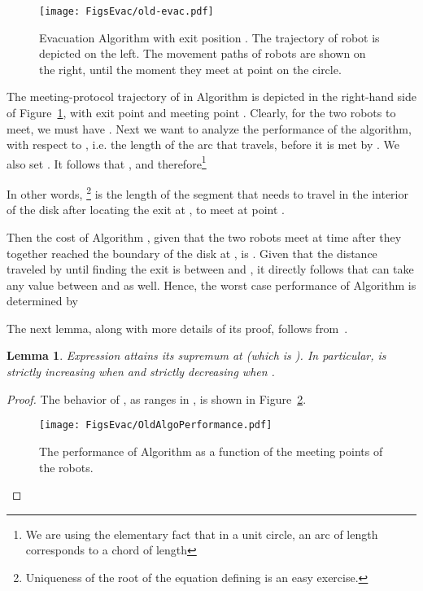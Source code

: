 \documentclass[
final
]{dmtcs-episciences}
\newtheorem{lemma}[theorem]{Lemma}
\theoremstyle{definition}
\begin{document}
\begin{figure}[!ht]
                \centering
                \texttt{[image: FigsEvac/old-evac.pdf]}
				\caption{Evacuation Algorithm  with exit position .  
				The trajectory of robot  is depicted on the left. 
				The movement paths of robots  are shown on the right, until the moment they meet at point  on the circle. 
}
                \label{fig: old-algo}
\end{figure}




The meeting-protocol trajectory of  in Algorithm  is depicted in the right-hand side of Figure~\ref{fig: old-algo}, with exit point  and meeting point . 
Clearly, for the two robots to meet, we must have . Next we want to analyze the performance of the algorithm, with respect to , i.e. the length  of the arc that  travels, before it is met by . We also set .
It follows that , and therefore\footnote{We are using the elementary fact that in a unit circle, an arc of length  corresponds to a chord of length }

In other words,  \footnote{Uniqueness of the root of the equation defining  is an easy exercise.} 
is the length of the segment  that  
needs to travel in the interior of the disk after locating the exit at , 
to meet  at point . 

Then the cost of Algorithm , given that the two robots meet at time  after they together reached the boundary of the disk at , is . Given that the distance  traveled by  until finding the exit is between  and , it directly follows that  can take any value between  and  as well. Hence, the worst case performance of Algorithm  is determined by

The next lemma, along with more details of its proof, follows from~\cite{CGGKMP}.
\begin{lemma}\label{lem: monotonicity of x+f(x)}
Expression  attains its supremum at 
(which is ). In particular,  is strictly increasing when  and strictly decreasing when .
\end{lemma}

\begin{proof}
The behavior of , as  ranges in , is shown in Figure~\ref{fig: performance old-algo}.
\begin{figure}[!ht]
                \centering
                \texttt{[image: FigsEvac/OldAlgoPerformance.pdf]}
                \caption{The performance of Algorithm  as a function of the meeting points of the robots.}
                \label{fig: performance old-algo}
\end{figure}
\end{proof}
\end{document}
